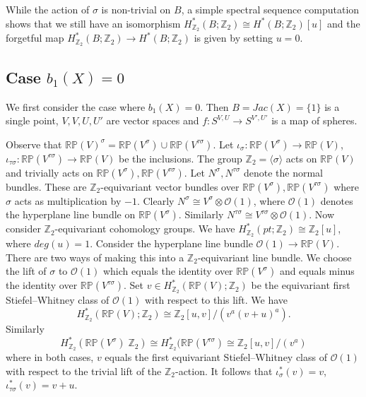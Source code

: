\documentclass{amsart}
\theoremstyle{definition}
\theoremstyle{remark}
\numberwithin{equation}{section}
\begin{document}
While the action of $\sigma$ is non-trivial on $B$, a simple spectral sequence computation shows that we still have an isomorphism $H^*_{\mathbb{Z}_2}( B ; \mathbb{Z}_2) \cong H^*(B ; \mathbb{Z}_2)[u]$ and the forgetful map $H^*_{\mathbb{Z}_2}(B ; \mathbb{Z}_2) \to H^*(B ; \mathbb{Z}_2)$ is given by setting $u=0$.


\subsection{Case $b_1(X) = 0$}\label{sec:b1=0loc}

We first consider the case where $b_1(X) = 0$. Then $B = Jac(X) = \{1\}$ is a single point, $V,V,U,U'$ are vector spaces and $f : S^{V,U} \to S^{V',U'}$ is a map of spheres.

Observe that $\mathbb{RP}(V)^\sigma = \mathbb{RP}(V^\sigma) \cup \mathbb{RP}(V^{\tau\sigma})$. Let $\iota_\sigma : \mathbb{RP}(V^\sigma) \to \mathbb{RP}(V)$, $\iota_{\tau \sigma} : \mathbb{RP}(V^{\tau \sigma}) \to \mathbb{RP}(V)$ be the inclusions. The group $\mathbb{Z}_2 = \langle \sigma \rangle$ acts on $\mathbb{RP}(V)$ and trivially acts on $\mathbb{RP}(V^\sigma), \mathbb{RP}(V^{\tau \sigma})$. Let $N^\sigma, N^{\tau \sigma}$ denote the normal bundles. These are $\mathbb{Z}_2$-equivariant vector bundles over $\mathbb{RP}(V^\sigma), \mathbb{RP}(V^{\tau \sigma})$ where $\sigma$ acts as multiplication by $-1$. Clearly $N^{\sigma} \cong V^{\sigma} \otimes \mathcal{O}(1)$, where $\mathcal{O}(1)$ denotes the hyperplane line bundle on $\mathbb{RP}(V^\sigma)$. Similarly $N^{\tau \sigma} \cong V^{\tau \sigma} \otimes \mathcal{O}(1)$. Now consider $\mathbb{Z}_2$-equivariant cohomology groups. We have $H^*_{\mathbb{Z}_2}(pt ; \mathbb{Z}_2) \cong \mathbb{Z}_2[u]$, where $deg(u) = 1$. Consider the hyperplane line bundle $\mathcal{O}(1) \to \mathbb{RP}(V)$. There are two ways of making this into a $\mathbb{Z}_2$-equivariant line bundle. We choose the lift of $\sigma$ to $\mathcal{O}(1)$ which equals the identity over $\mathbb{RP}(V^\sigma)$ and equals minus the identity over $\mathbb{RP}(V^{\tau\sigma})$. Set $v \in H^*_{\mathbb{Z}_2}( \mathbb{RP}(V) ; \mathbb{Z}_2)$ be the equivariant first Stiefel--Whitney class of $\mathcal{O}(1)$ with respect to this lift. We have
\[
H^*_{\mathbb{Z}_2}( \mathbb{RP}(V) ; \mathbb{Z}_2 ) \cong \mathbb{Z}_2[u,v]/( v^a(v+u)^a ).
\]
Similarly
\begin{equation}\label{equ:rpiso}
H^*_{\mathbb{Z}_2}( \mathbb{RP}(V^\sigma) \; \mathbb{Z}_2) \cong H^*_{\mathbb{Z}_2}(\mathbb{RP}(V^{\tau \sigma}) \cong \mathbb{Z}_2[u,v]/(v^a)
\end{equation}
where in both cases, $v$ equals the first equivariant Stiefel--Whitney class of $\mathcal{O}(1)$ with respect to the trivial lift of the $\mathbb{Z}_2$-action. It follows that $\iota_\sigma^*(v) = v$, $\iota_{\tau \sigma}^*(v) = v+u$.
\end{document}

